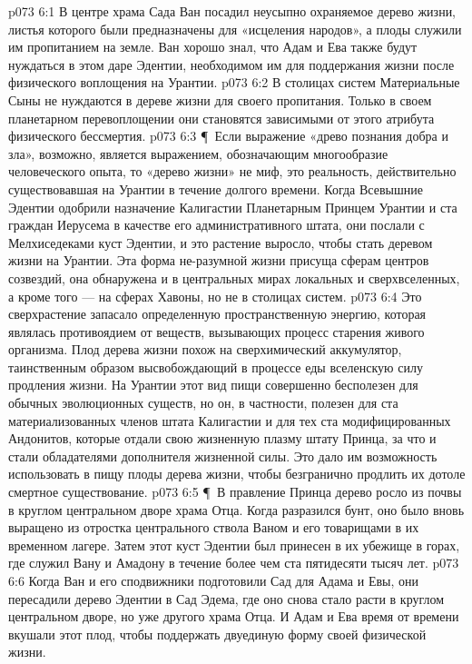 \vs p073 6:1 В центре храма Сада Ван посадил неусыпно охраняемое дерево жизни, листья которого были предназначены для «исцеления народов», а плоды служили им пропитанием на земле. Ван хорошо знал, что Адам и Ева также будут нуждаться в этом даре Эдентии, необходимом им для поддержания жизни после физического воплощения на Урантии.
\vs p073 6:2 В столицах систем Материальные Сыны не нуждаются в дереве жизни для своего пропитания. Только в своем планетарном перевоплощении они становятся зависимыми от этого атрибута физического бессмертия.
\vs p073 6:3 \P\ Если выражение «древо познания добра и зла», возможно, является выражением, обозначающим многообразие человеческого опыта, то «дерево жизни» не миф, это реальность, действительно существовавшая на Урантии в течение долгого времени. Когда Всевышние Эдентии одобрили назначение Калигастии Планетарным Принцем Урантии и ста граждан Иерусема в качестве его административного штата, они послали с Мелхиседеками куст Эдентии, и это растение выросло, чтобы стать деревом жизни на Урантии. Эта форма не\hyp{}разумной жизни присуща сферам центров созвездий, она обнаружена и в центральных мирах локальных и сверхвселенных, а кроме того --- на сферах Хавоны, но не в столицах систем.
\vs p073 6:4 Это сверхрастение запасало определенную пространственную энергию, которая являлась противоядием от веществ, вызывающих процесс старения живого организма. Плод дерева жизни похож на сверхимический аккумулятор, таинственным образом высвобождающий в процессе еды вселенскую силу продления жизни. На Урантии этот вид пищи совершенно бесполезен для обычных эволюционных существ, но он, в частности, полезен для ста материализованных членов штата Калигастии и для тех ста модифицированных Андонитов, которые отдали свою жизненную плазму штату Принца, за что и стали обладателями дополнителя жизненной силы. Это дало им возможность использовать в пищу плоды дерева жизни, чтобы безгранично продлить их дотоле смертное существование.
\vs p073 6:5 \P\ В правление Принца дерево росло из почвы в круглом центральном дворе храма Отца. Когда разразился бунт, оно было вновь выращено из отростка центрального ствола Ваном и его товарищами в их временном лагере. Затем этот куст Эдентии был принесен в их убежище в горах, где служил Вану и Амадону в течение более чем ста пятидесяти тысяч лет.
\vs p073 6:6 Когда Ван и его сподвижники подготовили Сад для Адама и Евы, они пересадили дерево Эдентии в Сад Эдема, где оно снова стало расти в круглом центральном дворе, но уже другого храма Отца. И Адам и Ева время от времени вкушали этот плод, чтобы поддержать двуединую форму своей физической жизни.
